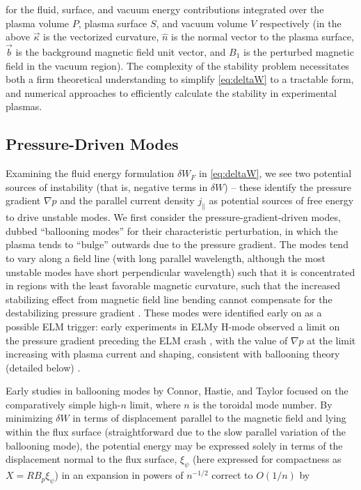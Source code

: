 \noindent for the fluid, surface, and vacuum energy contributions integrated over the plasma volume $P$, plasma surface $S$, and vacuum volume $V$ respectively (in the above $\vec{\kappa}$ is the vectorized curvature, $\hat{n}$ is the normal vector to the plasma surface, $\vec{b}$ is the background magnetic field unit vector, and $B_1$ is the perturbed magnetic field in the vacuum region).  The complexity of the stability problem necessitates both a firm theoretical understanding to simplify \cref{eq:deltaW} to a tractable form, and numerical approaches to efficiently calculate the stability in experimental plasmas.

\subsection{Pressure-Driven Modes}\label{subsec:mod_balloon}

Examining the fluid energy formulation $\delta W_F$ in \cref{eq:deltaW}, we see two potential sources of instability (that is, negative terms in $\delta W$) -- these identify the pressure gradient $\nabla p$ and the parallel current density $j_\parallel$ as potential sources of free energy to drive unstable modes.  We first consider the pressure-gradient-driven modes, dubbed ``ballooning modes'' for their characteristic perturbation, in which the plasma tends to ``bulge'' outwards due to the pressure gradient.  The modes tend to vary along a field line (with long parallel wavelength, although the most unstable modes have short perpendicular wavelength) such that it is concentrated in regions with the least favorable magnetic curvature, such that the increased stabilizing effect from magnetic field line bending cannot compensate for the destabilizing pressure gradient \cite{Freidberg1987}.  These modes were identified early on as a possible ELM trigger: early experiments in ELMy H-mode observed a limit on the pressure gradient preceding the ELM crash \cite{Kamada1996,Suttrop2000}, with the value of $\nabla p$ at the limit increasing with plasma current and shaping, consistent with ballooning theory (detailed below) \cite{Suttrop2000a}.

Early studies in ballooning modes by Connor, Hastie, and Taylor \cite{Connor1978,Connor1979} focused on the comparatively simple high-$n$ limit, where $n$ is the toroidal mode number.  By minimizing $\delta W$ in terms of displacement parallel to the magnetic field and lying within the flux surface (straightforward due to the slow parallel variation of the ballooning mode), the potential energy may be expressed solely in terms of the displacement normal to the flux surface, $\xi_\psi$ (here expressed for compactness as $X = RB_p \xi_\psi$) in an expansion in powers of $n^{-1/2}$ correct to $O(1/n)$ by


